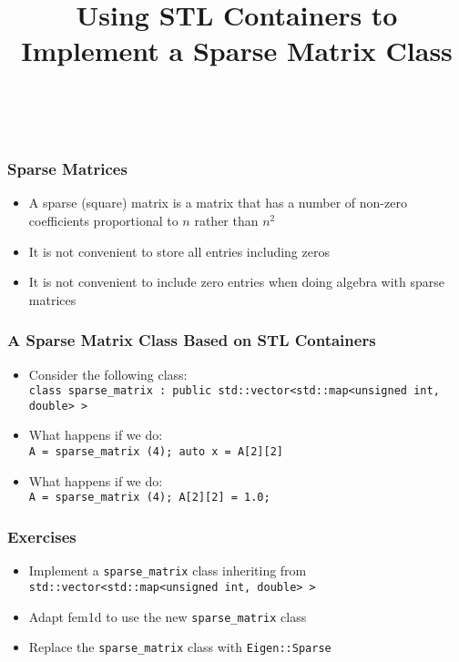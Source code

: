 \documentclass[smaller,a4paper]{beamer}
\newcommand{\cpp}[1]{\lstinline!#1!}
\begin{document}
\title{Using STL Containers to Implement a Sparse Matrix Class}
\frame{\titlepage}


\begin{frame}[fragile]
\    \frametitle{Sparse Matrices}
\begin{itemize}
\item A sparse (square) matrix is a matrix that has a number of non-zero coefficients proportional to $n$ rather than $n^{2}$
\item It is not convenient to store all entries including zeros
\item It is not convenient to include zero entries when doing algebra with sparse matrices
\end{itemize}
\end{frame}

\begin{frame}
    \frametitle{A Sparse Matrix Class Based on STL Containers}
\begin{itemize}
\item Consider the following class:\\[3mm]
\cpp{class sparse_matrix : public std::vector<std::map<unsigned int, double> >}
\item What happens if we do:\\[3mm]
\cpp{A = sparse_matrix (4); auto x = A[2][2] }
\item What happens if we do:\\[3mm]
\cpp{A = sparse_matrix (4); A[2][2] = 1.0;}
\end{itemize}
\end{frame}

\begin{frame}\frametitle{Exercises}
\begin{itemize}
\item Implement a \cpp{sparse_matrix} class inheriting from \cpp{std::vector<std::map<unsigned int, double> >}
\item Adapt fem1d to use the new \cpp{sparse_matrix} class 
\item Replace the \cpp{sparse_matrix} class with \cpp{Eigen::Sparse}
\end{itemize}

\end{frame}
\end{document}
